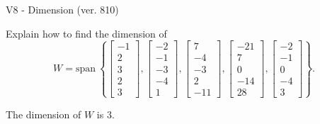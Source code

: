 \begin{exercise}
  \begin{exerciseTitle}V8 - Dimension (ver. 810)\end{exerciseTitle}
  \begin{exerciseStatement}
    Explain how to find the dimension of 
\[W=\mathrm{span}\ \left\{\left[\begin{array}{r}
-1 \\
2 \\
3 \\
2 \\
3
\end{array}\right] , \left[\begin{array}{r}
-2 \\
-1 \\
-3 \\
-4 \\
1
\end{array}\right] , \left[\begin{array}{r}
7 \\
-4 \\
-3 \\
2 \\
-11
\end{array}\right] , \left[\begin{array}{r}
-21 \\
7 \\
0 \\
-14 \\
28
\end{array}\right] , \left[\begin{array}{r}
-2 \\
-1 \\
0 \\
-4 \\
3
\end{array}\right]\right\}.\]



  \end{exerciseStatement}
  \begin{exerciseAnswer}
   The dimension of \(W\) is  \(3\).
  


  \end{exerciseAnswer}
\end{exercise}